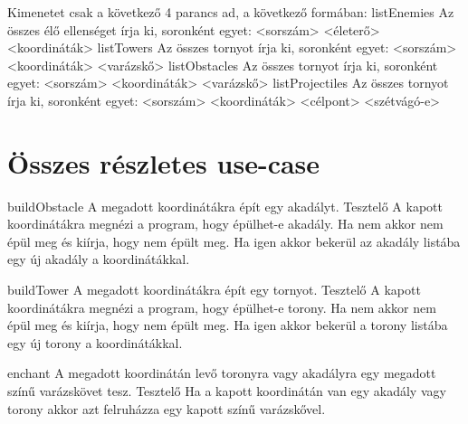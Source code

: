 Kimenetet csak a következő 4 parancs ad, a következő formában:\newline
\newline
listEnemies\newline
Az összes élő ellenséget írja ki, soronként egyet:\newline
<sorszám> <életerő> <koordináták>\newline
\newline
listTowers\newline
Az összes tornyot írja ki, soronként egyet:\newline
<sorszám> <koordináták> <varázskő>\newline
\newline
listObstacles\newline
Az összes tornyot írja ki, soronként egyet:\newline
<sorszám> <koordináták> <varázskő>\newline
\newline
listProjectiles\newline
Az összes tornyot írja ki, soronként egyet:\newline
<sorszám> <koordináták> <célpont> <szétvágó-e>\newline
\newline
\pagebreak
\section{Összes részletes use-case}

\usecase
{buildObstacle}
{A megadott koordinátákra épít egy akadályt.}
{Tesztelő}
{A kapott koordinátákra megnézi a program, hogy épülhet-e akadály. Ha nem akkor nem épül meg és kiírja, hogy nem épült meg.
Ha igen akkor bekerül az akadály listába egy új akadály a koordinátákkal.}

\usecase
{buildTower}
{A megadott koordinátákra épít egy tornyot.}
{Tesztelő}
{A kapott koordinátákra megnézi a program, hogy épülhet-e torony. Ha nem akkor nem épül meg és kiírja, hogy nem épült meg.
Ha igen akkor bekerül a torony listába egy új torony a koordinátákkal.}

\usecase
{enchant}
{A megadott koordinátán levő toronyra vagy akadályra egy megadott színű varázskövet tesz. }
{Tesztelő}
{Ha a kapott koordinátán van egy akadály vagy torony akkor azt felruházza egy kapott színű varázskővel.}

